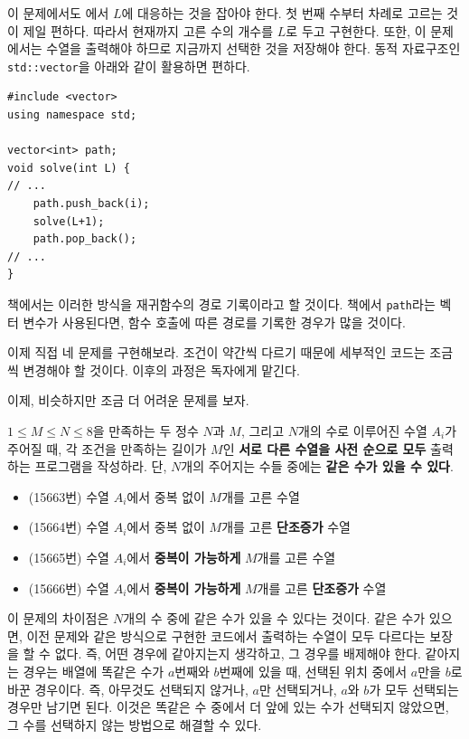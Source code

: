 이 문제에서도 에서 $L$에 대응하는 것을 잡아야 한다. 첫 번째 수부터 차례로 고르는 것이 제일 편하다. 따라서 현재까지 고른 수의 개수를 $L$로 두고 구현한다. 또한, 이 문제에서는 수열을 출력해야 하므로 지금까지 선택한 것을 저장해야 한다. 동적 자료구조인 \texttt{std::vector}을 아래와 같이 활용하면 편하다.

\begin{lstlisting}
#include <vector>
using namespace std;

vector<int> path;
void solve(int L) {
// ...
    path.push_back(i);
    solve(L+1);
    path.pop_back();
// ...
}
\end{lstlisting}

책에서는 이러한 방식을 재귀함수의 경로 기록이라고 할 것이다. 책에서 \texttt{path}라는 벡터 변수가 사용된다면, 함수 호출에 따른 경로를 기록한 경우가 많을 것이다.

이제 직접 네 문제를 구현해보라. 조건이 약간씩 다르기 때문에 세부적인 코드는 조금씩 변경해야 할 것이다. 이후의 과정은 독자에게 맡긴다.

이제, 비슷하지만 조금 더 어려운 문제를 보자.

\begin{example} $1 \leq M \leq N \leq 8$을 만족하는 두 정수 $N$과 $M$, 그리고 $N$개의 수로 이루어진 수열 $A_i$가 주어질 때, 각 조건을 만족하는 길이가 $M$인 \textbf{서로 다른 수열을 사전 순으로 모두} 출력하는 프로그램을 작성하라. 단, $N$개의 주어지는 수들 중에는 \textbf{같은 수가 있을 수 있다}.
    \begin{itemize}
        \item (15663번) 수열 $A_i$에서 중복 없이 $M$개를 고른 수열
        \item (15664번) 수열 $A_i$에서 중복 없이 $M$개를 고른 \textbf{단조증가} 수열
        \item (15665번) 수열 $A_i$에서 \textbf{중복이 가능하게} $M$개를 고른 수열
        \item (15666번) 수열 $A_i$에서 \textbf{중복이 가능하게} $M$개를 고른 \textbf{단조증가} 수열
    \end{itemize}
\end{example}

이 문제의 차이점은 $N$개의 수 중에 같은 수가 있을 수 있다는 것이다. 같은 수가 있으면, 이전 문제와 같은 방식으로 구현한 코드에서 출력하는 수열이 모두 다르다는 보장을 할 수 없다. 즉, 어떤 경우에 같아지는지 생각하고, 그 경우를 배제해야 한다. 같아지는 경우는 배열에 똑같은 수가 $a$번째와 $b$번째에 있을 때, 선택된 위치 중에서 $a$만을 $b$로 바꾼 경우이다. 즉, 아무것도 선택되지 않거나, $a$만 선택되거나, $a$와 $b$가 모두 선택되는 경우만 남기면 된다. 이것은 똑같은 수 중에서 더 앞에 있는 수가 선택되지 않았으면, 그 수를 선택하지 않는 방법으로 해결할 수 있다.

